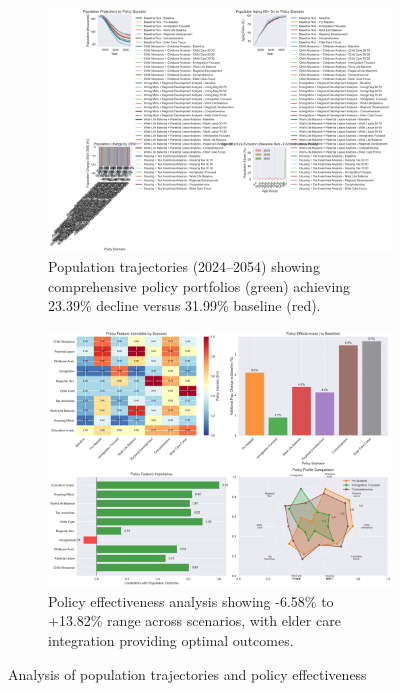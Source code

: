 \documentclass{article} %
\begin{document}
\begin{figure}[t]
    \centering
    \begin{subfigure}[b]{0.48\textwidth}
        \includegraphics[width=\textwidth]{population_projections.png}
        \caption{Population trajectories (2024--2054) showing comprehensive policy portfolios (green) achieving 23.39\% decline versus 31.99\% baseline (red).}
        \label{fig:population_proj}
    \end{subfigure}
    \hfill
    \begin{subfigure}[b]{0.48\textwidth}
        \includegraphics[width=\textwidth]{policy_analysis.png}
        \caption{Policy effectiveness analysis showing -6.58\% to +13.82\% range across scenarios, with elder care integration providing optimal outcomes.}
        \label{fig:policy_analysis}
    \end{subfigure}
    \caption{Analysis of population trajectories and policy effectiveness}
    \label{fig:main_results}
\end{figure}
\end{document}
